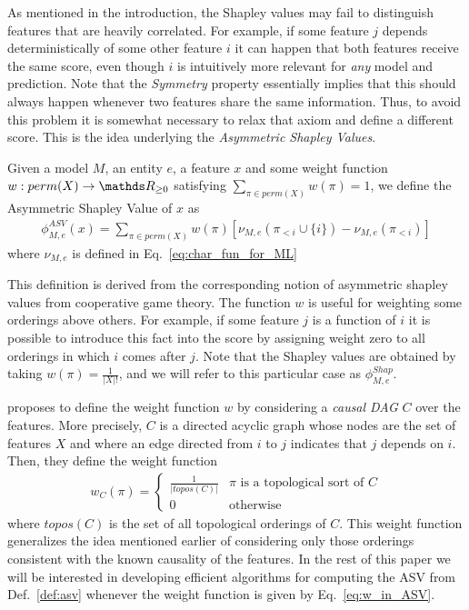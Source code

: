 As mentioned in the introduction, the Shapley values may fail to distinguish features that are heavily correlated. For example, if some feature $j$ depends deterministically of some other feature $i$ it can happen that both features receive the same score, even though $i$ is intuitively more relevant
for \textit{any} model and prediction. Note that the \textit{Symmetry} property essentially implies that this should always happen whenever two features share the same information. Thus, to avoid this problem it is somewhat necessary to relax that axiom and define a different score.
This is the idea underlying the \textit{Asymmetric Shapley Values}.

\begin{definition}\label{def:asv}
	Given a model $M$, an entity $e$, a feature $x$ and some weight function $w: perm(X) \to \R_{\geq 0}$ satisfying $\sum_{\pi \in perm(X)} w(\pi) = 1$, we define the Asymmetric Shapley Value of $x$ as
	\begin{align*}
		\phi^{ASV}_{M,e}(x) = \sum_{\pi \in perm(X)} w(\pi) \left[ \nu_{M,e}(\pi_{<i} \cup \{i\}) - \nu_{M,e}(\pi_{<i}) \right]
	\end{align*}
	where $\nu_{M,e}$ is defined in Eq.~\eqref{eq:char_fun_for_ML} 
\end{definition}

This definition is derived from the corresponding notion of asymmetric shapley values from cooperative game theory. The function $w$ is useful for weighting some orderings above others. For example, if some feature $j$ is a function of $i$ it is possible to introduce this fact into the score by assigning weight zero to all orderings in which $i$
comes after $j$. Note that the Shapley values are obtained by taking $w(\pi) = \frac{1}{|X|!}$, and we will refer to this particular case as $\phi^{Shap}_{M,e}$.

\cite{frye2019asymmetric} proposes to define the weight function $w$ by considering a \textit{causal DAG} $C$ over the features. More precisely, $C$ is a directed acyclic graph whose nodes are the set of features $X$ and where an edge directed from $i$ to $j$ indicates that $j$ depends on $i$. Then, they define the weight function
%
\begin{align}\label{eq:w_in_ASV}
	w_C(\pi) = \begin{cases}
		\frac{1}{|topos(C)|} & \pi \text{ is a topological sort of } C\\
		0 & \text{otherwise}
	\end{cases}	
\end{align}
%
where $topos(C)$ is the set of all topological orderings of $C$. This weight function generalizes the idea mentioned earlier of considering only those orderings consistent with the known causality of the features. In the rest of this paper we will be interested in developing efficient algorithms for computing the ASV from Def.~\ref{def:asv} whenever the weight function is given by 
Eq.~\eqref{eq:w_in_ASV}. 

